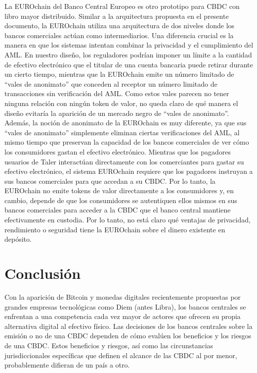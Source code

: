 \documentclass[a4paper,10pt]{article} %
\begin{document}
La EUROchain del Banco Central Europeo\cite[véase][]{ECB} es otro
prototipo para CBDC con libro mayor distribuido. Similar a la
arquitectura propuesta en el presente documento, la EUROchain utiliza
una arquitectura de dos niveles donde los bancos comerciales actúan como
intermediarios. Una diferencia crucial es la manera en que los sistemas
intentan combinar la privacidad y el cumplimiento del AML. En nuestro
diseño, los reguladores podrían imponer un límite a la cantidad de
efectivo electrónico que el titular de una cuenta bancaria puede retirar
durante un cierto tiempo, mientras que la EUROchain emite un número
limitado de ``vales de anonimato'' que conceden al receptor un número
limitado de transacciones sin verificación del AML. Como estos vales
parecen no tener ninguna relación con ningún token de valor, no queda
claro de qué manera el diseño evitaría la aparición de un mercado negro
de ``vales de anonimato''. Además, la noción de anonimato de la
EUROchain es muy diferente, ya que sus ``vales de anonimato'' simplemente
eliminan ciertas verificaciones del AML, al mismo tiempo que preservan
la capacidad de los bancos comerciales de ver cómo los consumidores
gastan el efectivo electrónico. Mientras que los pagadores usuarios de
Taler interactúan directamente con los comerciantes para gastar su
efectivo electrónico, el sistema EUROchain requiere que los pagadores
instruyan a sus bancos comerciales para que accedan a su CBDC. Por lo
tanto, la EUROchain no emite tokens de valor directamente a los
consumidores y, en cambio, depende de que los consumidores se
autentiquen ellos mismos en sus bancos comerciales para acceder a la
CBDC que el banco central mantiene efectivamente en custodia. Por lo
tanto, no está claro qué ventajas de privacidad, rendimiento o seguridad
tiene la EUROchain sobre el dinero existente en depósito.

\section{Conclusión}\label{7.-conclusiuxf3n}

Con la aparición de Bitcoin y monedas digitales recientemente propuestas
por grandes empresas tecnológicas como Diem (antes Libra), los bancos
centrales se enfrentan a una competencia cada vez mayor de actores que
ofrecen su propia alternativa digital al efectivo físico. Las decisiones
de los bancos centrales sobre la emisión o no de una CBDC dependen de
cómo evalúen los beneficios y los riesgos de una CBDC. Estos beneficios
y riesgos, así como las circunstancias jurisdiccionales específicas que
definen el alcance de las CBDC al por menor, probablemente difieran de
un país a otro.
\end{document}
